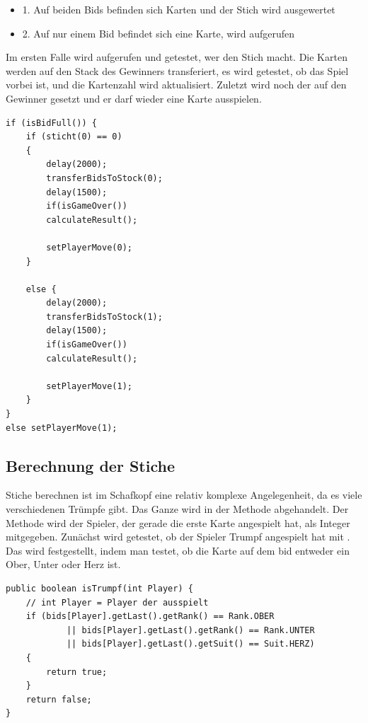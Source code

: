 \begin{itemize}
	\item 1. Auf beiden Bids befinden sich Karten und der Stich wird ausgewertet
	\item 2. Auf nur einem Bid befindet sich eine Karte,  wird 		 aufgerufen
\end{itemize}

Im ersten Falle wird  aufgerufen und getestet, wer den Stich
macht. Die Karten werden auf den Stack des Gewinners transferiert, es wird
getestet, ob das Spiel vorbei ist, und die Kartenzahl wird aktualisiert.
Zuletzt wird noch der  auf den Gewinner gesetzt und er darf
wieder eine Karte ausspielen.

\begin{lstlisting}[caption={initPlayers gamecycle},captionpos=b]
if (isBidFull()) {
    if (sticht(0) == 0)
    {
        delay(2000);
        transferBidsToStock(0);
        delay(1500);
        if(isGameOver())
        calculateResult();

        setPlayerMove(0);
    }

    else {
        delay(2000);
        transferBidsToStock(1);
        delay(1500);
        if(isGameOver())
        calculateResult();

        setPlayerMove(1);
    }
}
else setPlayerMove(1);
\end{lstlisting}

\subsection{Berechnung der Stiche}

Stiche berechnen ist im Schafkopf eine relativ komplexe Angelegenheit, da es
viele verschiedenen Trümpfe gibt. Das Ganze wird in der Methode
 abgehandelt. Der Methode wird der Spieler, der gerade
die erste Karte angespielt hat, als Integer mitgegeben. Zunächst wird getestet,
ob der Spieler Trumpf angespielt hat mit . Das wird
festgestellt, indem man testet, ob die Karte auf dem bid entweder ein Ober,
Unter oder Herz ist.

\begin{lstlisting}[caption={isTrumpf Methode},captionpos=b]
public boolean isTrumpf(int Player) {
    // int Player = Player der ausspielt
    if (bids[Player].getLast().getRank() == Rank.OBER
            || bids[Player].getLast().getRank() == Rank.UNTER
            || bids[Player].getLast().getSuit() == Suit.HERZ)
    {
        return true;
    }
    return false;
}
\end{lstlisting}

